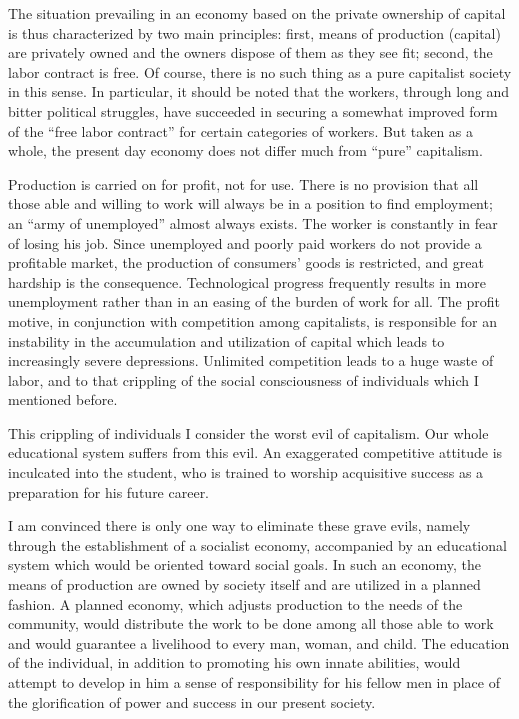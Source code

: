 \documentclass[12pt]{article}
\begin{document}
The situation prevailing in an economy based on the private ownership of capital is thus characterized by two main principles: first, means of production (capital) are privately owned and the owners dispose of them as they see fit; second, the labor contract is free. Of course, there is no such thing as a pure capitalist society in this sense. In particular, it should be noted that the workers, through long and bitter political struggles, have succeeded in securing a somewhat improved form of the “free labor contract” for certain categories of workers. But taken as a whole, the present day economy does not differ much from “pure” capitalism.

Production is carried on for profit, not for use. There is no provision that all those able and willing to work will always be in a position to find employment; an “army of unemployed” almost always exists. The worker is constantly in fear of losing his job. Since unemployed and poorly paid workers do not provide a profitable market, the production of consumers’ goods is restricted, and great hardship is the consequence. Technological progress frequently results in more unemployment rather than in an easing of the burden of work for all. The profit motive, in conjunction with competition among capitalists, is responsible for an instability in the accumulation and utilization of capital which leads to increasingly severe depressions. Unlimited competition leads to a huge waste of labor, and to that crippling of the social consciousness of individuals which I mentioned before.

This crippling of individuals I consider the worst evil of capitalism. Our whole educational system suffers from this evil. An exaggerated competitive attitude is inculcated into the student, who is trained to worship acquisitive success as a preparation for his future career.

I am convinced there is only one way to eliminate these grave evils, namely through the establishment of a socialist economy, accompanied by an educational system which would be oriented toward social goals. In such an economy, the means of production are owned by society itself and are utilized in a planned fashion. A planned economy, which adjusts production to the needs of the community, would distribute the work to be done among all those able to work and would guarantee a livelihood to every man, woman, and child. The education of the individual, in addition to promoting his own innate abilities, would attempt to develop in him a sense of responsibility for his fellow men in place of the glorification of power and success in our present society.
\end{document}
